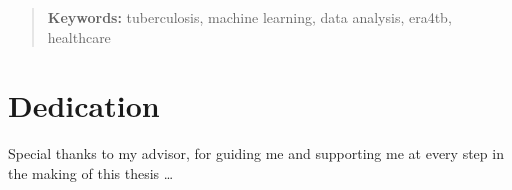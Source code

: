 \documentclass[../main.tex]{subfiles}
\begin{document}
\renewcommand\abstractname{\large\uppercase{Abstract}}
\begin{abstract}
\thispagestyle{plain}
\setcounter{page}{3}
	



\textbf{Keywords:}
tuberculosis, machine learning, data analysis, era4tb, healthcare
	
	\vfill
\end{abstract}
\newpage %
\thispagestyle{empty}
\mbox{}


\chapter*{Dedication}

\setcounter{page}{5}
	

Special thanks to my advisor, for guiding me and supporting me at every step in the making of this thesis \dots
\end{document}
